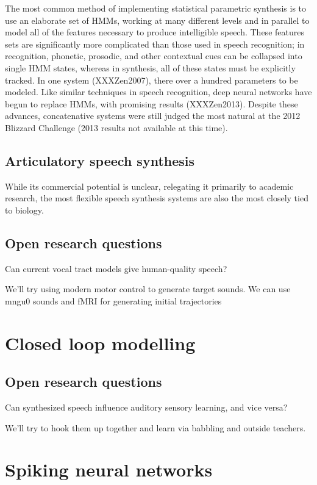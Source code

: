 \documentclass{article}
\begin{document}
The most common method of implementing
statistical parametric synthesis
is to use an elaborate set of HMMs,
working at many different levels
and in parallel to model
all of the features necessary to produce
intelligible speech.
These features sets are significantly
more complicated than those
used in speech recognition;
in recognition, phonetic, prosodic,
and other contextual cues
can be collapsed into single HMM states,
whereas in synthesis,
all of these states must be explicitly tracked.
In one system (XXXZen2007),
there over a hundred parameters to be modeled.
Like similar techniques in speech recognition,
deep neural networks have begun
to replace HMMs, with promising results (XXXZen2013).
Despite these advances, concatenative systems
were still judged the most natural
at the 2012 Blizzard Challenge
(2013 results not available at this time).

\subsection{Articulatory speech synthesis}

While its commercial potential is unclear,
relegating it primarily to academic research,
the most flexible speech synthesis systems
are also the most closely tied to biology.


\subsection{Open research questions}

Can current vocal tract models give human-quality speech?

We'll try using modern motor control to generate target sounds.
We can use mngu0 sounds and fMRI for generating initial trajectories

\section{Closed loop modelling}

\subsection{Open research questions}

Can synthesized speech
influence auditory sensory learning,
and vice versa?

We'll try to hook them up together
and learn via babbling and outside teachers.

\section{Spiking neural networks}
\end{document}
